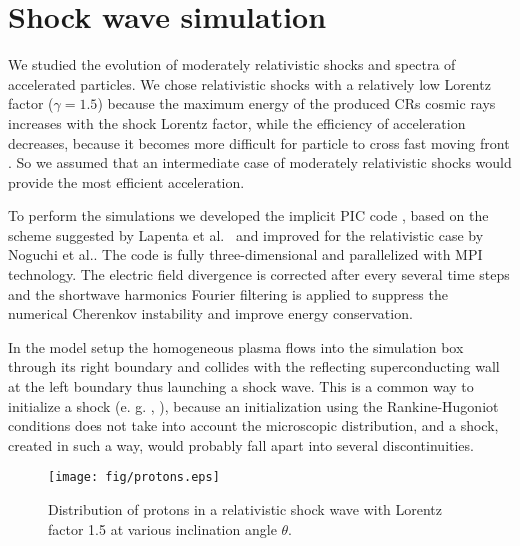 \documentclass[a4paper]{jpconf}
\begin{document}
\section{Shock wave simulation}
We studied the evolution of moderately relativistic shocks and spectra of accelerated particles. We chose relativistic shocks with a relatively low Lorentz factor ($\gamma=1.5$) because the maximum energy of the produced CRs cosmic rays increases with the shock Lorentz factor, while the efficiency of acceleration decreases, 
because it becomes more difficult for particle to cross fast moving front
%
\cite{Ellison2013}. So we assumed that an intermediate case of moderately relativistic shocks would provide the most efficient acceleration.

To perform the simulations we developed the implicit PIC code \cite{Romansky2016}, based on the scheme suggested by Lapenta et al.~\cite{Lapenta2006} and improved for the relativistic case by Noguchi et al.\cite{Noguchi2007}.
The code is fully three-dimensional and parallelized with MPI technology. The electric field divergence is corrected
after every several time steps and 
the shortwave harmonics Fourier filtering is applied
to suppress the numerical Cherenkov instability and improve energy conservation.

In the model setup the homogeneous plasma flows into the simulation box through its right boundary
and collides with the reflecting superconducting wall at the left boundary thus launching a shock wave. This  is a common way to initialize a shock (e. g. \cite{Sironi2011}, \cite{Iwamoto2017}), because an initialization using the Rankine-Hugoniot conditions does not take into account the microscopic distribution, and a shock, created in such a way, would probably fall apart into several discontinuities.

\begin{figure}[h!]
	\centering
	\texttt{[image: fig/protons.eps]} 
	\caption{Distribution of protons in a relativistic shock wave with Lorentz factor 1.5 at various inclination angle $\theta$.}
	\label{protons}
\end{figure} 
\end{document}

